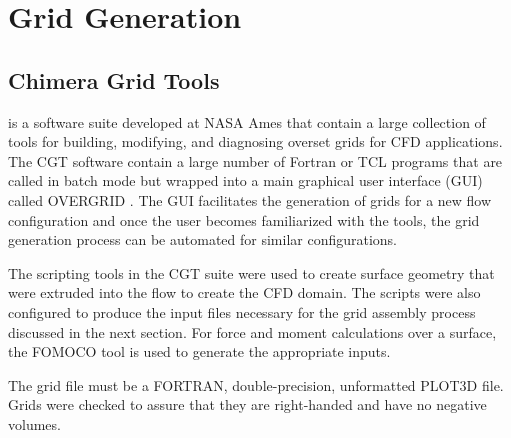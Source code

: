 \section{Grid Generation}

\subsection{Chimera Grid Tools}


 is a software suite developed at NASA Ames \cite{Chan2002} that contain a large collection of tools for building, modifying, and diagnosing overset grids for CFD applications. The CGT software contain a large number of Fortran or TCL programs that are called in batch mode but wrapped into a main graphical user interface (GUI) called OVERGRID \cite{Chan2010}. The GUI facilitates the generation of grids for a new flow configuration and once the user becomes familiarized with the tools, the grid generation process can be automated for similar configurations. 

The scripting tools in the CGT suite were used to create surface geometry that were extruded into the flow to create the CFD domain. The scripts were also configured to produce the input files necessary for the grid assembly process discussed in the next section. For force and moment calculations over a surface, the FOMOCO tool is used to generate the appropriate inputs. 

The grid file must be a FORTRAN, double-precision, unformatted PLOT3D file. Grids were checked to assure that they are right-handed and have no negative volumes.

% 
% 
% 
% 
% 
% 

